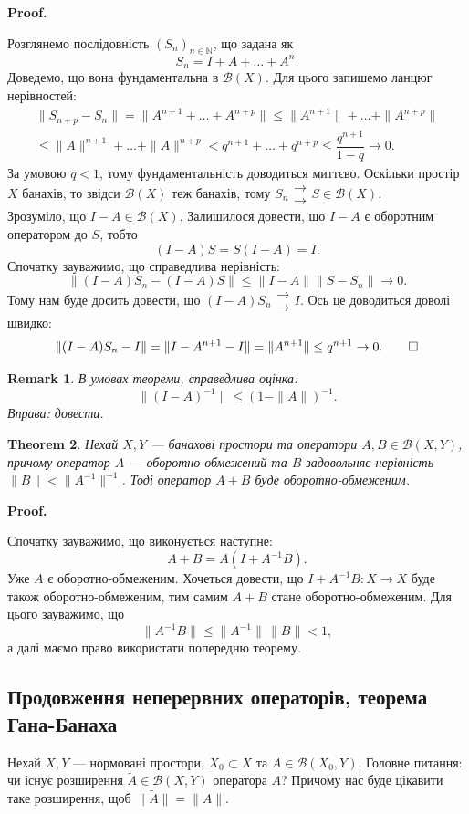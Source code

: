 \documentclass[a4paper, 10pt]{article}
\makeatletter
\theoremstyle{theoremdd}
\newtheorem{theorem}{Theorem}[subsection]
\theoremstyle{theoremdd}
\theoremstyle{theoremdd}
\theoremstyle{theoremdd}
\theoremstyle{theoremdd}
\theoremstyle{theoremdd}
\newtheorem{remark}[theorem]{Remark}
\theoremstyle{theoremdd}
\theoremstyle{theoremdd}
\renewenvironment{proof}[1][Proof.\\]{\par
\pushQED{\hfill \qed}%
\normalfont \topsep6\p@\@plus6\p@\relax
\trivlist
\item\relax
{\bfseries
#1\@addpunct{.}}\hspace\labelsep\ignorespaces
}{%
\popQED\endtrivlist\@endpefalse
}
\makeatother
\begin{document}
\begin{proof}
Розглянемо послідовність $(S_n)_{n \in \mathbb{N}}$, що задана як 
\[
S_n = I + A + \dots + A^n.
\]
Доведемо, що вона фундаментальна в $\mathcal{B}(X)$. Для цього запишемо ланцюг нерівностей:
\begin{multline*}
\|S_{n+p} - S_n\| = \| A^{n+1} + \dots + A^{n+p}\| \leq \|A^{n+1}\| + \dots + \|A^{n+p}\| \\
\leq \|A\|^{n+1} + \dots + \|A\|^{n+p} < q^{n+1} + \dots + q^{n+p} \leq \dfrac{q^{n+1}}{1-q} \to 0.
\end{multline*}
За умовою $q < 1$, тому фундаментальність доводиться миттєво. Оскільки простір $X$ банахів, то звідси $\mathcal{B}(X)$ теж банахів, тому $S_n \substack{\to \\ \to} S \in \mathcal{B}(X)$.\\ Зрозуміло, що $I-A \in \mathcal{B}(X)$. Залишилося довести, що $I-A$ є оборотним оператором до $S$, тобто 
\[
(I-A)S = S(I-A) = I.
\]
Спочатку зауважимо, що справедлива нерівність:
\[
\|(I-A)S_n - (I-A)S\| \leq \|I-A\| \|S-S_n\| \to 0.
\]
Тому нам буде досить довести, що $(I-A)S_n \substack{\to \\ \to} I$. Ось це доводиться доволі швидко:
\[
\| (I-A)S_n - I\| = \|I - A^{n+1} - I\| = \|A^{n+1}\| \leq q^{n+1} \to 0. \qedhere
\]
\end{proof}

\begin{remark}
В умовах теореми, справедлива оцінка: 
\[
\|(I-A)^{-1}\| \leq (1 - \|A\|)^{-1}.
\]
\textit{Вправа: довести.}
\end{remark}

\begin{theorem}
\label{sum_of_operators_and_inverse}
Нехай $X,Y$ --- банахові простори та оператори $A,B \in \mathcal{B}(X,Y)$, причому оператор $A$ --- оборотно-обмежений та $B$ задовольняє нерівність $\|B\| < \|A^{-1}\|^{-1}$. Тоді оператор $A+B$ буде оборотно-обмеженим.
\end{theorem}

\begin{proof}
Спочатку зауважимо, що виконується наступне:
\[
A + B = A(I + A^{-1}B).
\]
Уже $A$ є оборотно-обмеженим. Хочеться довести, що $I+A^{-1}B \colon X \to X$ буде також оборотно-обмеженим, тим самим $A+B$ стане оборотно-обмеженим. Для цього зауважимо, що
\[
\|A^{-1}B\| \leq \|A^{-1}\|\, \|B\| < 1,
\]
а далі маємо право використати попередню теорему.
\end{proof}

\subsection{Продовження неперервних операторів, теорема Гана-Банаха}
Нехай $X,Y$ --- нормовані простори, $X_0 \subset X$ та $A \in \mathcal{B}(X_0,Y)$. Головне питання: чи існує розширення $\tilde{A} \in \mathcal{B}(X,Y)$ оператора $A$? Причому нас буде цікавити таке розширення, щоб $\|\tilde{A}\| = \|A\|$.
\end{document}
